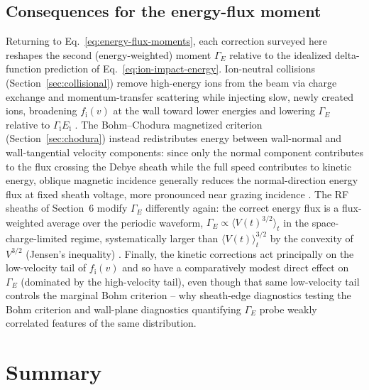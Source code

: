 \subsection{Consequences for the energy-flux moment}

Returning to Eq.~\eqref{eq:energy-flux-moments}, each correction surveyed here reshapes the second (energy-weighted) moment $\Gamma_{E}$ relative to the idealized delta-function prediction of Eq.~\eqref{eq:ion-impact-energy}. Ion-neutral collisions (Section~\ref{sec:collisional}) remove high-energy ions from the beam via charge exchange and momentum-transfer scattering while injecting slow, newly created ions, broadening $f_{\mathrm{i}}(v)$ at the wall toward lower energies and lowering $\Gamma_{E}$ relative to $\Gamma_{\mathrm{i}} E_{\mathrm{i}}$ \cite{ref0024}. The Bohm--Chodura magnetized criterion (Section~\ref{sec:chodura}) instead redistributes energy between wall-normal and wall-tangential velocity components: since only the normal component contributes to the flux crossing the Debye sheath while the full speed contributes to kinetic energy, oblique magnetic incidence generally reduces the normal-direction energy flux at fixed sheath voltage, more pronounced near grazing incidence \cite{ref0017,ref0018}. The RF sheaths of Section~6 modify $\Gamma_{E}$ differently again: the correct energy flux is a flux-weighted average over the periodic waveform, $\Gamma_{E} \propto \langle V(t)^{3/2} \rangle_{t}$ in the space-charge-limited regime, systematically larger than $\langle V(t) \rangle_{t}^{3/2}$ by the convexity of $V^{3/2}$ (Jensen's inequality) \cite{ref0055}. Finally, the kinetic corrections act principally on the low-velocity tail of $f_{\mathrm{i}}(v)$ and so have a comparatively modest direct effect on $\Gamma_{E}$ (dominated by the high-velocity tail), even though that same low-velocity tail controls the marginal Bohm criterion -- why sheath-edge diagnostics testing the Bohm criterion and wall-plane diagnostics quantifying $\Gamma_{E}$ probe weakly correlated features of the same distribution.

\section{Summary}

